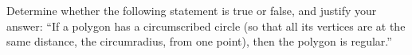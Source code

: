 Determine whether the following statement is true or false, and justify your answer: ``If a polygon has a circumscribed circle (so that all its vertices are at the same distance, the circumradius, from one point), then the polygon is regular.''\,
